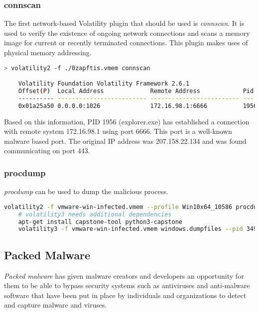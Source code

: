 \subsubsection{connscan}
The first network-based Volatility plugin that should be used is \textit{connscan}. It is used to verify the existence of ongoing network connections and scans a memory image for current or recently terminated connections. This plugin makes uses of physical memory addressing.

\begin{lstlisting}[language=bash]
    > volatility2 -f ./0zapftis.vmem connscan

    Volatility Foundation Volatility Framework 2.6.1
    Offset(P)  Local Address             Remote Address            Pid
    ---------- ------------------------- ------------------------- ---
    0x01a25a50 0.0.0.0:1026              172.16.98.1:6666          1956
\end{lstlisting}

Based on this information, PID 1956 (explorer.exe) has established a connection with remote system 172.16.98.1 using port 6666. This port is a well-known malware based port. The original IP address was 207.158.22.134 and was found communicating on port 443.

\newpage

\subsubsection{procdump}
\textit{procdump} can be used to dump the malicious process.

\begin{lstlisting}[language=bash]
    volatility2 -f vmware-win-infected.vmem --profile Win10x64_10586 procdump --pid 3496 --dump-dir .
    # volatility3 needs additional dependencies
    apt-get install capstone-tool python3-capstone
    volatility3 -f vmware-win-infected.vmem windows.dumpfiles --pid 3496
\end{lstlisting}

\subsection{Packed Malware}
\textit{Packed malware} has given malware creators and developers an opportunity for them to be able to bypass security systems such as antiviruses and anti-malware software that have been put in place by individuals and organizations to detect and capture malware and viruses.\\

